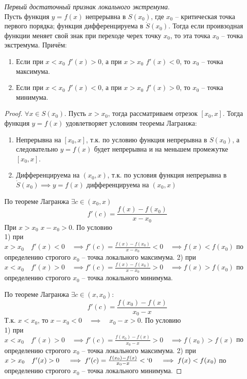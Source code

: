\begin{theorem}
  \textit{Первый достаточный признак локального экстремума}. \\
  Пусть функция $y=f(x)$ непрерывна в $S(x_0)$, где $x_0$ -- критическая точка первого порядка; функция дифференцируема в $\mathring{S}(x_0)$. Тогда если проивзодная функции меняет свой знак при переходе черех точку $x_0$, то эта точка $x_0$ -- точка экстремума. Причём:
  \begin{enumerate}
    \item Если при $x < x_0$ $f'(x) > 0$, а при  $x > x_0$ $f'(x) < 0$, то  $x_0$ -- точка максимума.
    \item Если при $x < x_0$ $f'(x) < 0$, а при  $x > x_0$ $f'(x) > 0$, то  $x_0$ -- точка минимума.
  \end{enumerate}
\end{theorem}
\begin{proof}
  $\forall x \in S(x_0)$. Пусть $x > x_0$, тогда рассматриваем отрезок $[x_0, x]$. Тогда функция $y = f(x)$ удовлетворяет условиям теоремы Лагранжа:
  \begin{enumerate}
    \item Непрерывна на $[x_0, x]$, т.к. по условию функция непрерывна в $S(x_0)$, а следовательно $y=f(x)$ будет непрерывна и на меньшем промежутке $[x_0, x]$.
    \item Дифференцируема на $(x_0, x)$, т.к. по условия функция непрерывна в $\mathring{S}(x_0) \implies y = f(x)$ дифференцируема на $(x_0, x)$
  \end{enumerate}

  По теореме Лагранжа $\exists  c \in  (x_0, x)$ \[
    f'(c) = \frac{f(x) - f(x_0)}{x - x_0}
  \]
  При $x > x_0$ $x - x_0 > 0$. 
  По условию \\
  1) при $x > x_0 \quad f'(x) < 0 \quad \implies f'(c) = \frac{f(x) - f(x_0)}{x - x_0} < 0 \quad \implies f(x) < f(x_0)$ по определению строгого  $x_0$ -- точка локального максимума.
  2) при $x < x_0 \quad f'(x) > 0 \quad \implies f'(c) = \frac{f(x) - f(x_0)}{x - x_0} > 0 \quad \implies f(x) > f(x_0)$ по определению строгого  $x_0$ -- точка локального минимума.

  По теореме Лагранжа $\exists c \in (x, x_0)$: \[
  f'(c) = \frac{f(x_0) - f(x)}{x_0 - x}
  \] 
  Т.к. $x < x_0$, то $x - x_0 < 0 \quad \implies \quad x_0 - x > 0$.
  По условию \\
  1) при $x < x_0 \quad f'(x) > 0 \quad \implies f'(c) = \frac{f(x_0) - f(x)}{x_0 - x} > 0 \quad \implies f(x_0) > f(x)$ по определению строгого  $x_0$ -- точка локального максимума.
  2) при $x > x_0 \quad f'(x) > 0 \quad \implies f'(c) = \frac{f(x_0) - f(x)}{x_0 - x} <` 0 \quad \implies f(x) < f(x_0)$ по определению строгого  $x_0$ -- точка локального минимума.
\end{proof}

